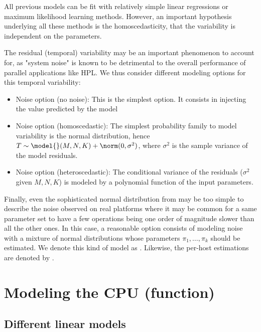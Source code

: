         All previous models can be fit with relatively simple linear regressions or maximum likelihood learning methods.
        However, an important hypothesis underlying all these methods is the homoscedasticity, \ie that the variability
        is independent on the parameters.

        The residual (temporal) variability may be an important phenomenon to account for, as "system noise" is known to
        be detrimental to the overall performance of parallel applications like HPL. We thus consider different modeling
        options for this temporal variability:
        \begin{itemize}
            \item Noise option  (no noise): This is the simplest option. It consists in injecting the value
                predicted by the model
            \item Noise option  (homoscedastic): The simplest probability family to model variability is the
                normal distribution, hence \(T \sim \model{}(M,N,K) + \norm(0,\sigma^2)\), where \(\sigma^2\) is the
                sample variance of the model residuals.
            \item Noise option  (heteroscedastic): The conditional variance of the residuals (\ie \(\sigma^2\)
                given \(M,N,K\)) is modeled by a polynomial function of the input parameters.
        \end{itemize}
        Finally, even the sophisticated normal distribution from  may be too simple to describe the noise
        observed on real platforms where it may be common for a same parameter set to have a few operations being one
        order of magnitude slower than all the other ones. In this case, a reasonable option consists of modeling noise
        with a mixture of normal distributions whose parameters \(\pi_1 , \dots, \pi_k\) should be estimated. We denote
        this kind of model as \noisep{}. Likewise, the per-host estimations are denoted by \noise[H]{}.

    \section{Modeling  the CPU (\ie \dgemm function)}
    \label{sec:dgemm_model}

        \subsection{Different linear models}%
        \label{sub:dgemm_model:different_models}

